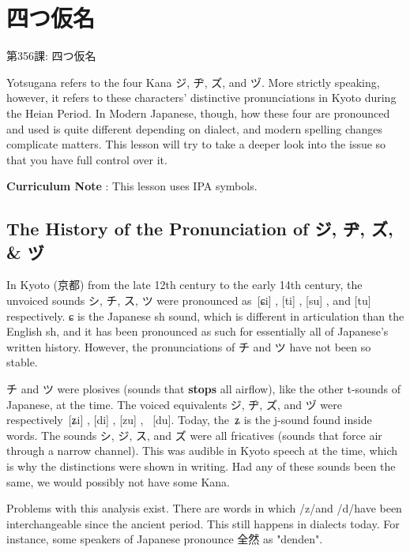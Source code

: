     
\chapter{四つ仮名}

\begin{center}
\begin{Large}
第356課: 四つ仮名 
\end{Large}
\end{center}
 
\par{ Yotsugana refers to the four Kana ジ, ヂ, ズ, and ヅ. More strictly speaking, however, it refers to these characters' distinctive pronunciations in Kyoto during the Heian Period. In Modern Japanese, though, how these four are pronounced and used is quite different depending on dialect, and modern spelling changes complicate matters. This lesson will try to take a deeper look into the issue so that you have full control over it. }

\par{\textbf{Curriculum Note }: This lesson uses IPA symbols. }
      
\section{The History of the Pronunciation of ジ, ヂ, ズ, \& ヅ}
 
\par{ In Kyoto (京都) from the late 12th century to the early 14th century, the unvoiced sounds シ, チ, ス, ツ were pronounced as [ɕi] , [ti] , [su] , and [tu] respectively. ɕ is the Japanese sh sound, which is different in articulation than the English sh, and it has been pronounced as such for essentially all of Japanese's written history. However, the pronunciations of チ and ツ have not been so stable. }

\par{ チ and ツ were plosives (sounds that \textbf{stops }all airflow), like the other t-sounds of Japanese, at the time. The voiced equivalents ジ, ヂ, ズ, and ヅ were respectively [ʑi] , [di] , [zu] ,  [du]. Today, the ʑ is the j-sound found inside words. The sounds シ, ジ, ス, and ズ were all fricatives (sounds that force air through a narrow channel). This was audible in Kyoto speech at the time, which is why the distinctions were shown in writing. Had any of these sounds been the same, we would possibly not have some Kana. }

\par{ Problems with this analysis exist. There are words in which \slash z\slash  and \slash d\slash  have been interchangeable since the ancient period. This still happens in dialects today. For instance, some speakers of Japanese pronounce 全然 as "denden". }

